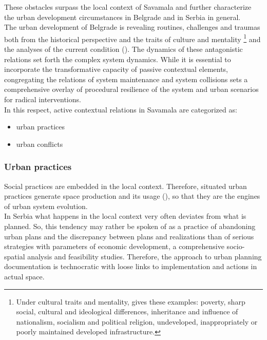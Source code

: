 \documentclass[11pt]{report}
\begin{document}
{{{{These obstacles surpass the local context of Savamala and further characterize the urban development circumstances in Belgrade and in Serbia in general.
\\

The  urban  development  of  Belgrade  is  revealing  routines, challenges  and  traumas both from the historical perspective and the traits of culture and mentality
\footnote{Under cultural traits and mentality, \href{Samardzic}{\cite{doytchinov_belgrade_2015}} gives these examples: poverty, sharp social, cultural and ideological differences, inheritance and influence of nationalism, socialism and political religion, undeveloped, inappropriately or poorly maintained developed infrastructure.}
and the analyses of the current condition (\href{ref}{\citealt{doytchinov_belgrade_2015}}). 
The dynamics of these antagonistic relations set forth the complex system dynamics.
While it is essential to incorporate the transformative capacity of passive contextual elements, congregating the relations of system maintenance and system collisions sets a comprehensive overlay of procedural resilience of the system and urban scenarios for radical interventions.
\\

In this respect, active contextual relations in Savamala are categorized as:

\begin{itemize}
\item urban practices
\item urban conflicts
\end{itemize}

\subsubsection{Urban practices}

Social practices are embedded in the local context. Therefore, situated urban practices generate space production and its usage (\href{ref}{\citealt{de_holanda_exceptional_2011}}), so that they are the engines of urban system evolution. %
\\

In Serbia what happens in the local context very often deviates from what is planned. So, this tendency may rather be spoken of as a practice of abandoning urban plans and the discrepancy between plans and realizations than of serious strategies with parameters of economic development, a comprehensive socio-spatial analysis and feasibility studies. Therefore, the approach to urban planning documentation is technocratic with loose links to implementation and actions in actual space.
\\

}}}}
\end{document}
